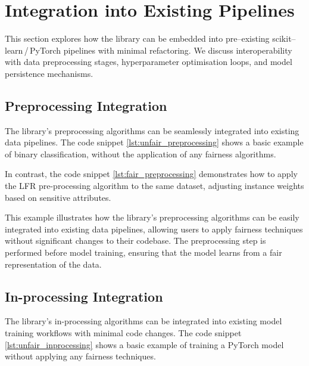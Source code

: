 \documentclass[12pt,a4paper,openright,twoside]{book}
\begin{document}
\section{Integration into Existing Pipelines}
This section explores how the library can be embedded into pre--existing scikit--learn\,/\,PyTorch pipelines with minimal refactoring. We discuss interoperability with data preprocessing stages, hyperparameter optimisation loops, and model persistence mechanisms.

\subsection{Preprocessing Integration}
The library's preprocessing algorithms can be seamlessly integrated into existing data pipelines. The code snippet \ref{lst:unfair_preprocessing} shows a basic example of binary classification, without the application of any fairness algorithms.



In contrast, the code snippet \ref{lst:fair_preprocessing} demonstrates how to apply the LFR pre-processing algorithm to the same dataset, adjusting instance weights based on sensitive attributes.



This example illustrates how the library's preprocessing algorithms can be easily integrated into existing data pipelines, allowing users to apply fairness techniques without significant changes to their codebase. The preprocessing step is performed before model training, ensuring that the model learns from a fair representation of the data.

\subsection{In-processing Integration}

The library's in-processing algorithms can be integrated into existing model training workflows with minimal code changes. The code snippet \ref{lst:unfair_inprocessing} shows a basic example of training a PyTorch model without applying any fairness techniques.
\end{document}
